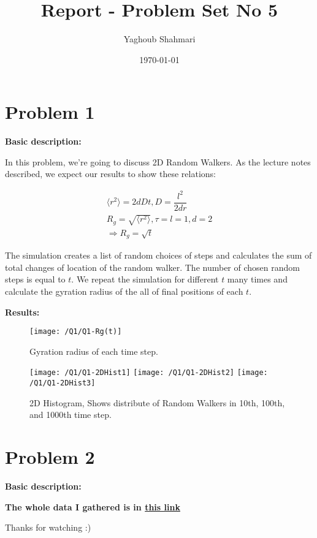 \documentclass{article}
\author{Yaghoub Shahmari}
\title{Report - Problem Set No 5}
\date{\today}
\begin{document}
    \maketitle
    \section*{Problem 1}
    \textbf{Basic description:}

    In this problem, we're going to discuss 2D Random Walkers.
    As the lecture notes described, we expect our results to show these relations:

    \begin{gather*}
        \langle r^{2}\rangle =2dDt,D=\dfrac{l^{2}}{2dr}\\
        R_{g}=\sqrt{\langle r^{2}\rangle },\tau =l=1,d=2\\
        \Rightarrow R_{g}=\sqrt{t}
    \end{gather*}
    
    The simulation creates a list of random choices of steps
    and calculates the sum of total changes of location of the random walker.
    The number of chosen random steps is equal to $t$.
    We repeat the simulation for different $t$ many times
    and calculate the gyration radius of the all of final positions of each $t$.

    \textbf{Results:}

    \begin{figure}[!htb]
        \centering
        \texttt{[image: /Q1/Q1-Rg(t)]}
        \label{fig:1.1}
        \caption{Gyration radius of each time step.}
    \end{figure}

    \begin{figure}[!htb]
        \centering
        \texttt{[image: /Q1/Q1-2DHist1]}
        \label{fig:1.2}
        \texttt{[image: /Q1/Q1-2DHist2]}
        \label{fig:1.3}
        \texttt{[image: /Q1/Q1-2DHist3]}
        \label{fig:1.4}
        \caption{2D Histogram, Shows distribute of Random Walkers in 10th, 100th, and 1000th time step.}
    \end{figure}

    \pagebreak

    \section*{Problem 2}
    \textbf{Basic description:}



    \centering
    \textbf{The whole data I gathered is in \href{https://github.com/shahmari/ComputationalPhysics-Fall2021/tree/main/ProblemSet4/Data}{this link}}
    
    Thanks for watching :)
\end{document}
